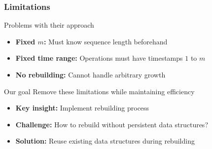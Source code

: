 \documentclass[fleqn]{beamer}
\begin{document}
\begin{frame}
    \frametitle{Limitations}
    
    \begin{alertblock}{Problems with their approach}
        \begin{itemize}
        \item \textbf{Fixed $m$:} Must know sequence length beforehand
        \item \textbf{Fixed time range:} Operations must have timestamps $1$ to $m$
        \item \textbf{No rebuilding:} Cannot handle arbitrary growth
        \end{itemize}
    \end{alertblock} \pause
    
    \begin{block}{Our goal}
        Remove these limitations while maintaining efficiency
    \end{block} \pause
    
    \begin{itemize}
    \item \textbf{Key insight:} Implement rebuilding process \vfill
    \item \textbf{Challenge:} How to rebuild without persistent data structures? \vfill
    \item \textbf{Solution:} Reuse existing data structures during rebuilding \vfill
    \end{itemize}
    
    
\end{frame}
\end{document}
